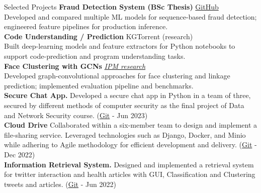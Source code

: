 \documentclass{resume}
\begin{document}
\begin{rSection}{Selected Projects}
\textbf{Fraud Detection System (BSc Thesis)} \hfill \href{https://github.com/kahbodaeini/Fraud-Detection}{GitHub} \\
Developed and compared multiple ML models for sequence-based fraud detection; engineered feature pipelines for production inference.
\\
\textbf{Code Understanding / Prediction} \hfill KGTorrent (research) \\
Built deep-learning models and feature extractors for Python notebooks to support code-prediction and program understanding tasks.
\\
\textbf{Face Clustering with GCNs} \hfill \textit{\href{https://ipm.ac.ir/}{IPM research}} \\
Developed graph-convolutional approaches for face clustering and linkage prediction; implemented evaluation pipeline and benchmarks.
\\
\textbf{Secure Chat App.} Developed a secure chat app in Python in a team of three, secured by different methods of computer security as the final project of Data and Network Security course. (\href{https://github.com/rerfan24/DNS-project}{Git} - Jun 2023)
\\
\textbf{Cloud Drive} Collaborated within a six-member team to design and implement a file-sharing service. Leveraged technologies such as
Django, Docker, and Minio while adhering to Agile methodology for efficient development and delivery. (\href{https://github.com/sad-project}{Git} - Dec 2022)
\\
\textbf{Information Retrieval System.} Designed and implemented a retrieval system for twitter interaction and health articles with GUI, Classification and Clustering tweets and articles. (\href{https://github.com/IR1401-Spring-Final-Projects/SocialMediaHealth1401-19_39}{Git} - Jun 2022)

\end{rSection}
\end{document}
